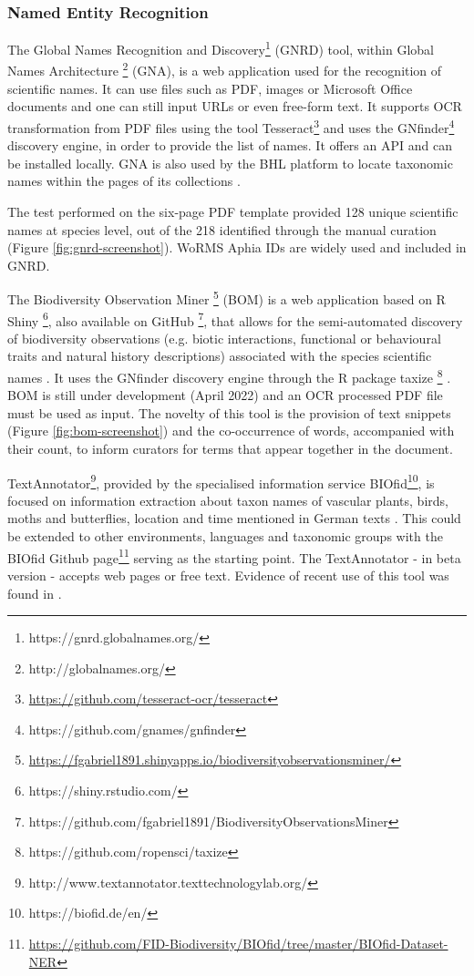    \subsubsection{Named Entity Recognition}
   The Global Names Recognition and Discovery\footnote{https://gnrd.globalnames.org/}
(GNRD) tool, within Global Names Architecture
\footnote{http://globalnames.org/} (GNA), is a web application used for the
recognition of scientific names. It can use files such as PDF, images or
Microsoft Office documents and one can still input URLs or even free-form text.
It supports OCR transformation from PDF files using the tool
Tesseract\footnote{\url{https://github.com/tesseract-ocr/tesseract}} and uses
the GNfinder\footnote{https://github.com/gnames/gnfinder} discovery engine, in
order to provide the list of names. It offers an API and can be installed
locally. GNA is also used by the BHL platform to locate taxonomic names within
the pages of its collections \parencite{richard_improving_2020}.

The test performed on the \parencite{WoRMS:SourceID:40714} six-page PDF template
provided 128 unique scientific names at species level, out of the 218
identified through the manual curation
(Figure \ref{fig:gnrd-screenshot}). WoRMS Aphia IDs
\parencite{vandepitte_fishing_2015,martin_miguez_european_2019} are widely used and
included in GNRD.

The Biodiversity Observation Miner \footnote{\url{https://fgabriel1891.shinyapps.io/biodiversityobservationsminer/}}
(BOM) is a web application based on R Shiny \footnote{https://shiny.rstudio.com/},
also available on GitHub \footnote{https://github.com/fgabriel1891/BiodiversityObservationsMiner},
that allows for the semi-automated discovery of biodiversity observations (e.g.
biotic interactions, functional or behavioural traits and natural history
descriptions) associated with the species scientific names \parencite{10.3897/BDJ.7.e28737}.
It uses the GNfinder discovery engine through the R package
taxize \footnote{https://github.com/ropensci/taxize} \parencite{chamberlain_taxize_2013}.
BOM is still under development (April 2022) and an OCR processed PDF file must
be used as input. The novelty of this tool is the provision of text snippets
(Figure \ref{fig:bom-screenshot}) and the co-occurrence of words, accompanied
with their count, to inform curators for terms that appear together in the
document.

TextAnnotator\footnote{http://www.textannotator.texttechnologylab.org/},
provided by the specialised information service BIOfid\footnote{https://biofid.de/en/},
is focused on information extraction about taxon names of vascular plants,
birds, moths and butterflies, location and time mentioned in German texts
\parencite{driller_workflow_2018,driller_fast_2020}. This could be extended to
other environments, languages and taxonomic groups with the BIOfid Github
page\footnote{\url{https://github.com/FID-Biodiversity/BIOfid/tree/master/BIOfid-Dataset-NER}}
serving as the starting point. The TextAnnotator - in beta version - accepts
web pages or free text. Evidence of recent use of this tool was found in \parencite{driller_fast_2020}.

